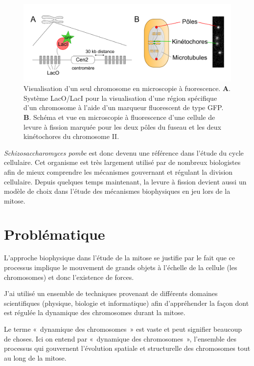 \documentclass[12pt,a4paper,twoside,openright]{book}
\begin{document}
\begin{figure}[htbp]
\centering
\includegraphics{figures/intro/lac.png}
\caption{\label{fig:lac}Visualisation d'un seul chromosome en
microscopie à fuorescence. \textbf{A}. Système LacO/LacI pour la
visualisation d'une région spécifique d'un chromosome à l'aide d'un
marqueur fluorescent de type GFP. \textbf{B}. Schéma et vue en
microscopie à fluorescence d'une cellule de levure à fission marquée
pour les deux pôles du fuseau et les deux kinétochores du chromosome
II.}
\end{figure}

\emph{Schizosaccharomyces pombe} est donc devenu une référence dans
l'étude du cycle cellulaire. Cet organisme est très largement utilisé
par de nombreux biologistes afin de mieux comprendre les mécanismes
gouvernant et régulant la division cellulaire. Depuis quelques temps
maintenant, la levure à fission devient aussi un modèle de choix dans
l'étude des mécanismes biophysiques en jeu lors de la mitose.

\section{Problématique}\label{probluxe9matique}

L'approche biophysique dans l'étude de la mitose se justifie par le fait
que ce processus implique le mouvement de grands objets à l'échelle de
la cellule (les chromosomes) et donc l'existence de forces.

J'ai utilisé un ensemble de techniques provenant de différents domaines
scientifiques (physique, biologie et informatique) afin d'appréhender la
façon dont est régulée la dynamique des chromosomes durant la mitose.

Le terme «~dynamique des chromosomes~» est vaste et peut signifier
beaucoup de choses. Ici on entend par «~dynamique des chromosomes~»,
l'ensemble des processus qui gouvernent l'évolution spatiale et
structurelle des chromosomes tout au long de la mitose.
\end{document}
